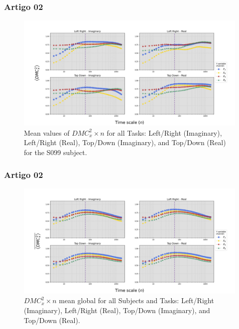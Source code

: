 \documentclass[11pt, aspectratio=169]{beamer}
\begin{document}
\begin{frame}
  \frametitle{Artigo 02}

  \begin{figure}[!h]
    \includegraphics[height=.5\paperheight]{../Figures/art_02/Fig7.jpg}
    \caption{Mean values of $DMC_{x}^{2} \times n$ for all Tasks: Left/Right (Imaginary), Left/Right (Real), Top/Down (Imaginary), and Top/Down (Real) for the S099 subject.}
    \label{fig07}
  \end{figure}
\end{frame}

\begin{frame}
  \frametitle{Artigo 02}

  \begin{figure}[!h]
    \includegraphics[height=.5\paperheight]{../Figures/art_02/Fig8.jpg}
    \caption{$DMC_{x}^{2} \times n$ mean global for all Subjects and Tasks: Left/Right (Imaginary), Left/Right (Real), Top/Down (Imaginary), and Top/Down (Real).}
    \label{fig08}
  \end{figure}
\end{frame}
\end{document}

